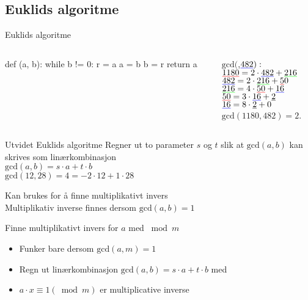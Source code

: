 \subsection*{Euklids algoritme}
\begin{frame}[fragile]{Euklids algoritme}
\begin{columns}
    \begin{column}{0.45\textwidth}
\begin{python}
def (a, b):
    while b != 0:
        r = a %
        a = b
        b = r
    return a
\end{python}
 	\end{column}
 	\pause
    \begin{column}{0.45\textwidth}
        $\text{gcd}($,$\mathunderline{blue}{482}):$\\[2mm]
        \pause
        $\mathunderline{red}{1180} = 2 \cdot \mathunderline{blue}{482} + \mathunderline{green}{216}$\\
        \pause
        $\mathunderline{blue}{482} = 2 \cdot \mathunderline{green}{216} + \mathunderline{red}50$\\
        \pause
        $\mathunderline{green}{216} = 4 \cdot \mathunderline{red}{50} + \mathunderline{blue}{16}$\\
        \pause
        $\mathunderline{red}{50} = 3 \cdot \mathunderline{blue}{16} + \underline{2}$\\
        \pause
        $\mathunderline{blue}{16} = 8 \cdot \underline{2} + 0$\\[2mm]

        \pause
        $\text{gcd}(1180,482) = 2$.
 	\end{column}
\end{columns}


\end{frame}

\begin{frame}[fragile]{}
\begin{block}{Utvidet Euklids algoritme}
Regner ut to parameter $s$ og $t$ slik at $\text{gcd}(a,b)$ kan skrives som linærkombinasjon\\
$\text{gcd}(a,b)=s\cdot a+t\cdot b$\\
$\text{gcd}(12,28)=4=-2\cdot 12 + 1\cdot 28$\medskip

Kan brukes for å finne multiplikativt invers\\
Multiplikativ inverse finnes dersom $\text{gcd}(a,b)=1$
\end{block}
\pause

\begin{block}{Finne multiplikativt invers for $a$ med $\bmod m$}
\begin{itemize}
\item Funker bare dersom $\text{gcd}(a,m)=1$\\
\item Regn ut linærkombinasjon $\text{gcd}(a,b)=s\cdot a+t\cdot b$ med 
\item $a\cdot x \equiv 1 (\bmod m)$ er multiplicative inverse
\end{itemize}
\end{block}
\end{frame}


